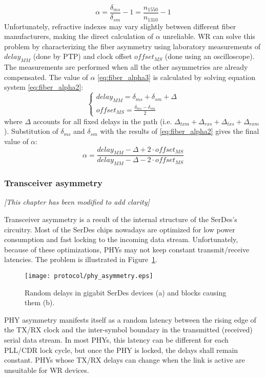 \begin{equation}
\label{eq:fiber_alpha1}
\alpha = \frac{\delta_{ms}}{\delta_{sm}} - 1 = \frac{n_{1550}}{n_{1310}} - 1
\end{equation}
Unfortunately, refractive indexes may vary slightly between different fiber
manufacturers, making the direct calculation of $\alpha$ unreliable. WR
can solve this problem by characterizing the fiber asymmetry using
laboratory measurements of $delay_{MM}$ (done by PTP) and clock offset
$offset_{MS}$ (done using an oscilloscope). The measurements are performed
when all the other asymmetries are already compensated. The value of
$\alpha$ \ref{eq:fiber_alpha3} is calculated by solving equation system
\ref{eq:fiber_alpha2}:
\begin{equation}
\label{eq:fiber_alpha2}
\begin{cases}
delay_{MM} = \delta_{ms} + \delta_{sm} + \Delta \\
offset_{MS} = \frac{\delta_{ms} - \delta_{sm}}{2}
\end{cases}
\end{equation}
where $\Delta$ accounts for all fixed delays in the path (i.e. $\Delta_{txm}
+ \Delta_{rxs} + \Delta_{txs} + \Delta_{rxm}$). Substitution of $\delta_{ms}$
and $\delta_{sm}$ with the results of \ref{eq:fiber_alpha2} gives the final
value of $\alpha$:
\begin{equation}
\label{eq:fiber_alpha3}
\alpha = \frac{delay_{MM}  - \Delta + 2\cdot offset_{MS}}{delay_{MM} -
\Delta - 2\cdot offset_{MS}}
\end{equation}

\subsubsection{Transceiver asymmetry}
\label{s:xcvr_asymmetry}
\label{sec:calibForGigbitE}
\textit{[This chapter has been modified to add clarity]}


Transceiver asymmetry is a result of the internal structure of the SerDes's
circuitry. Most of the SerDes chips nowadays are optimized for low power
consumption and fast locking to the incoming data stream. Unfortunately,
because of these optimizations, PHYs may not keep constant transmit/receive
latencies. The problem is illustrated in Figure~\ref{fig:phy_asymmetry}.
\begin{figure}[ht!]
  \centering
  \texttt{[image: protocol/phy\_asymmetry.eps]}
  \caption{Random delays in gigabit SerDes devices (a) and blocks causing them
  (b).}
  \label{fig:phy_asymmetry}
\end{figure}
PHY asymmetry manifests itself as a random latency between the rising edge of
the TX/RX clock and the inter-symbol boundary in the transmitted (received)
serial data stream. In most PHYs, this latency can be different for each
PLL/CDR lock cycle, but once the PHY is locked, the delays shall remain
constant. PHYs whose TX/RX delays can change when the link is active are
unsuitable for WR devices.


